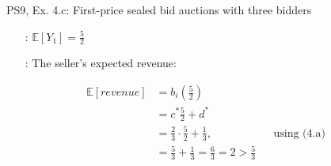 \begin{frame}{PS9, Ex. 4.c: First-price sealed bid auctions with three bidders}
\begin{multicols}{2}
\begin{itemize}
        \item[\nth{1}:] $\mathbb{E}[Y_1]=\frac{5}{2}$
        \item[\nth{2}:] The seller's expected revenue:
      \end{itemize} \vspace{-12pt}
      \begin{align*}
        \mathbb{E}[revenue]&=b_i\left(\frac{5}{2}\right)\\
                           &= c^*\frac{5}{2}+d^*\\
                           &= \frac{2}{3}\cdot\frac{5}{2}+\frac{1}{3},&&\text{using (4.a)}\\
                           &= \frac{5}{3}+\frac{1}{3}=\frac{6}{3}=2>\frac{5}{3}
      \end{align*}
      \vfill\null
    \end{multicols}
    \vfill\null
\end{frame}
